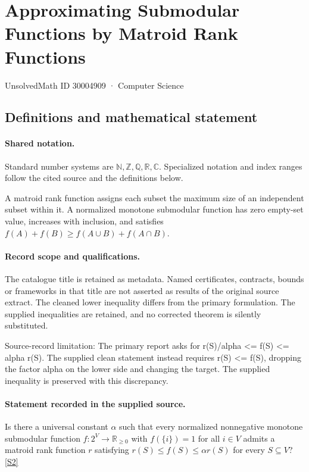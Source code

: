\documentclass[11pt]{article}
\newcommand{\sref}[2]{\hyperlink{source:#1:#2}{[S#2]}}
\begin{document}
\setcounter{section}{30004908}
\section{Approximating Submodular Functions by Matroid Rank Functions}\label{30004909}
{\small\sffamily UnsolvedMath ID 30004909 · Computer Science}
\subsection{Definitions and mathematical statement}

\paragraph{Shared notation.}Standard number systems are $\mathbb N,\mathbb Z,\mathbb Q,\mathbb R,\mathbb C$. Specialized notation and index ranges follow the cited source and the definitions below.


A matroid rank function assigns each subset the maximum size of an independent subset within it. A normalized monotone submodular function has zero empty-set value, increases with inclusion, and satisfies $f(A)+f(B)\geq f(A\cup B)+f(A\cap B)$.
\paragraph{Record scope and qualifications.}
The catalogue title is retained as metadata. Named certificates, contracts, bounds or frameworks in that title are not asserted as results of the original source extract.
The cleaned lower inequality differs from the primary formulation. The supplied inequalities are retained, and no corrected theorem is silently substituted.

Source-record limitation: The primary report asks for r(S)/alpha <= f(S) <= alpha r(S). The supplied clean statement instead requires r(S) <= f(S), dropping the factor alpha on the lower side and changing the target. The supplied inequality is preserved with this discrepancy.
\paragraph{Statement recorded in the supplied source.}
Is there a universal constant $\alpha$ such that every normalized nonnegative monotone submodular function $f:2^V\to\mathbb R_{\geq0}$ with $f(\{i\})=1$ for all $i\in V$ admits a matroid rank function $r$ satisfying $r(S)\leq f(S)\leq\alpha r(S)$ for every $S\subseteq V$? \sref{30004909}{2}
\end{document}
